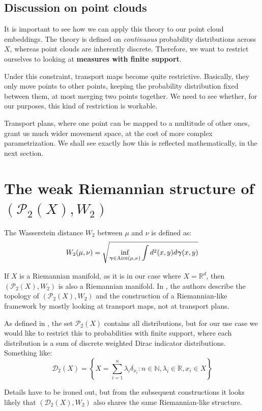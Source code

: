 \documentclass{article}
\begin{document}
\subsection{Discussion on point clouds}

It is important to see how we can apply this theory to our point cloud embeddings.
The theory is defined on \textit{continuous} probability distributions across
$X$, whereas point clouds are inherently discrete. Therefore, we want to restrict
ourselves to looking at \textbf{measures with finite support}.

Under this constraint, transport maps become quite restrictive. Basically,
they only move points to other points, keeping the probability distribution
fixed between them, at most merging two points together. We need to see 
whether, for our purposes, this kind of restriction is workable.

Transport plans, where one point can be mapped to a multitude of other ones,
grant us much wider movement space, at the cost of more complex parametrization.
We shall see exactly how this is reflected mathematically, in the next 
section.

\section{The weak Riemannian structure of $(\mathscr{P}_2(X), W_2)$}

The Wasserstein distance $W_2$ between $\mu$ and $\nu$ is 
defined as:
\[W_2(\mu, \nu) = \sqrt{\inf_{\bm\gamma\in \textsc{Adm}(\mu, \nu)} \int d^2(x,y)d\bm\gamma(x,y)} \]

If $X$ is a Riemannian manifold, as it is in our case where $X=\mathbb{R}^d$,
then $(\mathscr{P}_2(X), W_2)$ is also a Riemannian manifold. In 
\cite{Ambrosio2013AUG}, the authors describe the topology of $(\mathscr{P}_2(X), W_2)$
and the construction of a Riemannian-like framework by mostly looking at
transport maps, not at transport plans.

As defined in \cite{Ambrosio2013AUG}, the set $\mathscr{P}_2(X)$ contains all 
distributions, but for our use case we would like to restrict this to 
probabilities with finite support, where each distribution is a sum of 
discrete weighted Dirac indicator distributions. Something like:
\[\mathscr{D}_2(X) = \left\{X = \sum_{i=1}^{n}\lambda_i\delta_{x_i} : 
n\in \mathbb{N}, \lambda_i\in\mathbb{R}, x_i\in X \right\} \]

Details have to be ironed out, but from the subsequent constructions it
looks likely that $(\mathscr{D}_2(X), W_2)$ also shares the same 
Riemannian-like structure.
\end{document}
